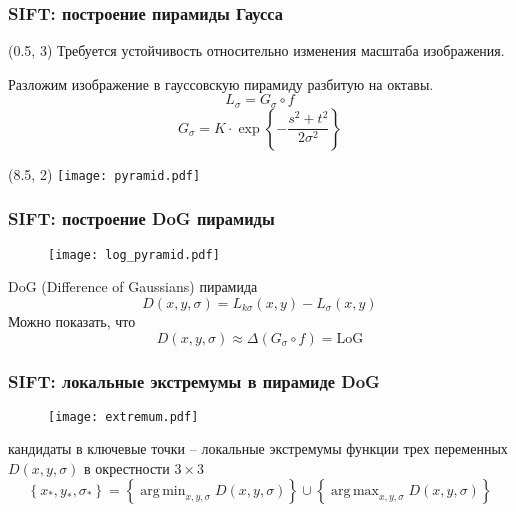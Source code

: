 \documentclass[12pt, usepdftitle=false, aspectratio=1610]{beamer}
\DeclareMathOperator*{\argmax}{arg\,max}
\DeclareMathOperator*{\argmin}{arg\,min}
\begin{document}
\begin{frame}
\frametitle{SIFT: построение пирамиды Гаусса}
\begin{textblock}{8}(0.5, 3)
    Требуется устойчивость относительно изменения масштаба изображения.
    \vspace{0.5cm}

    Разложим изображение в гауссовскую пирамиду разбитую на октавы.
    $$
        L_\sigma = G_\sigma \circ f
    $$
    $$
        G_\sigma=K\cdot\exp\left\{-\frac{s^2+t^2}{2\sigma^2}\right\}
    $$
\end{textblock}
\begin{textblock}{5}(8.5, 2)
    \texttt{[image: pyramid.pdf]}
\end{textblock}
\end{frame}

\begin{frame}
\frametitle{SIFT: построение DoG пирамиды}
\begin{figure}
    \texttt{[image: log\_pyramid.pdf]}
\end{figure}
DoG (Difference of Gaussians) пирамида
$$
     D(x,y,\sigma) = L_{k\sigma}(x,y)-L_{\sigma}(x,y)  
$$
Можно показать, что
$$
    D(x,y,\sigma)\approx
    \Delta \left(G_\sigma\circ f\right)=\mathrm{LoG}
$$
\end{frame}

\begin{frame}
\frametitle{SIFT: локальные экстремумы в пирамиде DoG}
\begin{figure}
    \texttt{[image: extremum.pdf]}
\end{figure}
кандидаты в ключевые точки -- локальные экстремумы функции трех переменных $D(x,y,\sigma)$
в окрестности $3\times3$
$$
    \left\{x_\ast,y_\ast,\sigma_\ast\right\}=
    \left\{\argmin_{x,y,\sigma} D(x,y,\sigma)\right\}
    \cup
    \left\{\argmax_{x,y,\sigma} D(x,y,\sigma)\right\}
$$
\end{frame}
\end{document}
